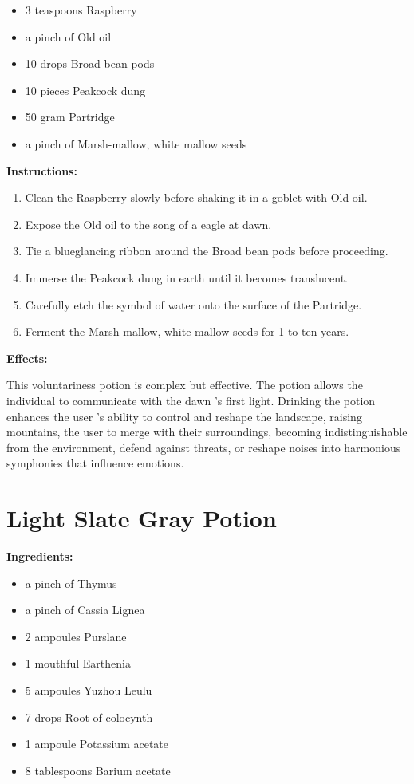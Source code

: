 \documentclass{article}
\begin{document}
\begin{itemize}
  \item 3 teaspoons Raspberry
  \item a pinch of Old oil
  \item 10 drops Broad bean pods
  \item 10 pieces Peakcock dung
  \item 50 gram Partridge
  \item a pinch of Marsh-mallow, white mallow seeds
\end{itemize}

\textbf{Instructions:}

\begin{enumerate}
  \item Clean the Raspberry slowly before shaking it in a goblet with Old oil.
  \item Expose the Old oil to the song of a eagle at dawn.
  \item Tie a blueglancing ribbon around the Broad bean pods before proceeding.
  \item Immerse the Peakcock dung in earth until it becomes translucent.
  \item Carefully etch the symbol of water onto the surface of the Partridge.
  \item Ferment the Marsh-mallow, white mallow seeds for 1 to ten years.
\end{enumerate}

\textbf{Effects:}

This voluntariness potion is complex but effective. The potion allows the individual to communicate with the dawn 's first light. Drinking the potion enhances the user 's ability to control and reshape the landscape, raising mountains, the user to merge with their surroundings, becoming indistinguishable from the environment, defend against threats, or reshape noises into harmonious symphonies that influence emotions.

\newpage
\section*{Light Slate Gray Potion}

\textbf{Ingredients:}

\begin{itemize}
  \item a pinch of Thymus
  \item a pinch of Cassia Lignea
  \item 2 ampoules Purslane
  \item 1 mouthful Earthenia
  \item 5 ampoules Yuzhou Leulu
  \item 7 drops Root of colocynth
  \item 1 ampoule Potassium acetate
  \item 8 tablespoons Barium acetate
\end{itemize}
\end{document}
